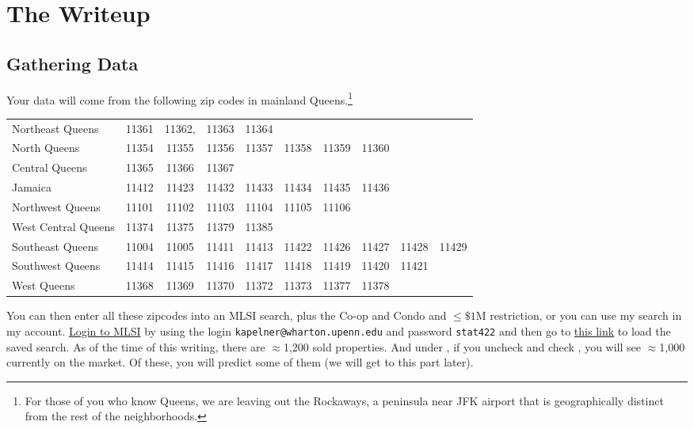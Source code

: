 \documentclass[12pt]{article}
\begin{document}
\section{The Writeup}

\subsection{Gathering Data}

Your data will come from the following zip codes in mainland Queens.\footnote{For those of you who know Queens, we are leaving out the Rockaways, a peninsula near JFK airport that is geographically distinct from the rest of the neighborhoods.}

\begin{table}[htp]
\centering\small
\begin{tabular}{l|ccccccccc}
\hline
Northeast Queens		&11361& 11362,& 11363& 11364 \\
North Queens		&11354& 11355& 11356& 11357& 11358& 11359& 11360 \\
Central Queens		&11365& 11366& 11367 \\
Jamaica				&11412& 11423& 11432& 11433& 11434& 11435& 11436 \\
Northwest Queens	&11101& 11102& 11103& 11104& 11105& 11106 \\
West Central Queens	&11374& 11375& 11379& 11385 \\
Southeast Queens		&11004& 11005& 11411& 11413& 11422& 11426& 11427& 11428& 11429 \\
Southwest Queens	&11414& 11415& 11416& 11417& 11418& 11419& 11420& 11421 \\
West Queens			&11368& 11369& 11370& 11372& 11373& 11377& 11378 \\\hline
\end{tabular}
\end{table}

You can then enter all these zipcodes into an MLSI search, plus the Co-op and Condo and $\leq \$1$M restriction, or you can use my search in my account. \href{https://secure.mlsli.com/Account/CustomerLogin.aspx}{Login to MLSI} by using the login \texttt{kapelner@wharton.upenn.edu} and password \texttt{stat422} and then go to \href{http://www.mlsli.com/listing/listingsearch.aspx?ListingSearch=1455845}{this link} to load the saved search. As of the time of this writing, there are $\approx$1,200 sold properties. And under , if you uncheck  and check , you will see $\approx$1,000 currently on the market. Of these, you will predict some of them (we will get to this part later).
\end{document}

